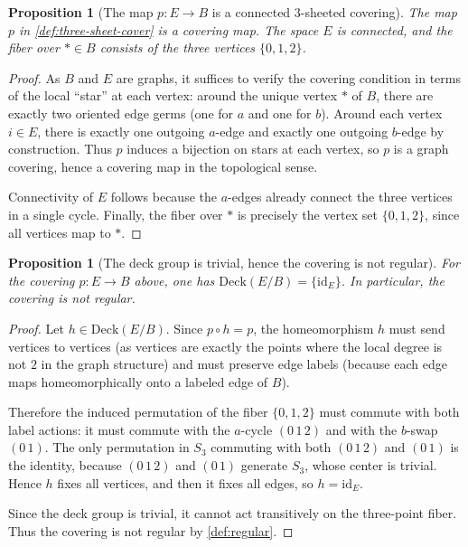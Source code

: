 \documentclass[11pt,a4paper]{article}
\newtheorem{proposition}[theorem]{Proposition}
\theoremstyle{definition}
\theoremstyle{remark}
\begin{document}
\begin{proposition}[The map \(p:E\to B\) is a connected \(3\)-sheeted covering]
\label{prop:three-sheet-covering}
The map \(p\) in \cref{def:three-sheet-cover} is a covering map. The space \(E\) is connected, and the fiber over \(*\in B\) consists of the three vertices \(\{0,1,2\}\).
\end{proposition}

\begin{proof}
As \(B\) and \(E\) are graphs, it suffices to verify the covering condition in terms of the local ``star'' at each vertex: around the unique vertex \(*\) of \(B\), there are exactly two oriented edge germs (one for \(a\) and one for \(b\)). Around each vertex \(i\in E\), there is exactly one outgoing \(a\)-edge and exactly one outgoing \(b\)-edge by construction. Thus \(p\) induces a bijection on stars at each vertex, so \(p\) is a graph covering, hence a covering map in the topological sense.

Connectivity of \(E\) follows because the \(a\)-edges already connect the three vertices in a single cycle. Finally, the fiber over \(*\) is precisely the vertex set \(\{0,1,2\}\), since all vertices map to \(*\).
\end{proof}

\begin{proposition}[The deck group is trivial, hence the covering is not regular]
\label{prop:trivial-deck-group}
For the covering \(p:E\to B\) above, one has \(\mathrm{Deck}(E/B)=\{ \mathrm{id}_E\}\). In particular, the covering is not regular.
\end{proposition}

\begin{proof}
Let \(h\in \mathrm{Deck}(E/B)\). Since \(p\circ h=p\), the homeomorphism \(h\) must send vertices to vertices (as vertices are exactly the points where the local degree is not \(2\) in the graph structure) and must preserve edge labels (because each edge maps homeomorphically onto a labeled edge of \(B\)).

Therefore the induced permutation of the fiber \(\{0,1,2\}\) must commute with both label actions: it must commute with the \(a\)-cycle \((0\,1\,2)\) and with the \(b\)-swap \((0\,1)\). The only permutation in \(S_3\) commuting with both \((0\,1\,2)\) and \((0\,1)\) is the identity, because \((0\,1\,2)\) and \((0\,1)\) generate \(S_3\), whose center is trivial. Hence \(h\) fixes all vertices, and then it fixes all edges, so \(h=\mathrm{id}_E\).

Since the deck group is trivial, it cannot act transitively on the three-point fiber. Thus the covering is not regular by \cref{def:regular}.
\end{proof}
\end{document}
